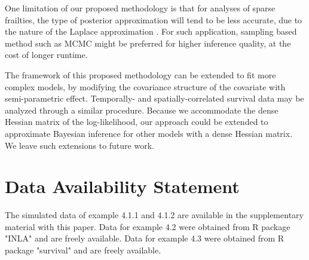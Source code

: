 \documentclass[ba]{imsart}
\begin{document}
One limitation of our proposed methodology is that for analyses of sparse frailties, the type of posterior approximation will tend to be less accurate, due to the nature of the Laplace approximation \citep{Ogden2013ASR}. For such application, sampling based method such as MCMC might be preferred for higher inference quality, at the cost of longer runtime. 

The framework of this proposed methodology can be extended to fit more complex models, by modifying the covariance structure of the covariate with semi-parametric effect. Temporally- and spatially-correlated survival data may be analyzed through a similar procedure. Because we accommodate the dense Hessian matrix of the log-likelihood, our approach could be extended to approximate Bayesian inference for other models with a dense Hessian matrix. We leave such extensions to future work.

\section*{Data Availability Statement}
The simulated data of example 4.1.1 and 4.1.2 are available in the supplementary material with this paper. Data for example 4.2 were obtained from R package "INLA" \citep{inla} and are freely available.
Data for example 4.3 were obtained from R package "survival" \citep{survival-package} and are freely available. 


\nocite{*}%

%

\clearpage
\end{document}

